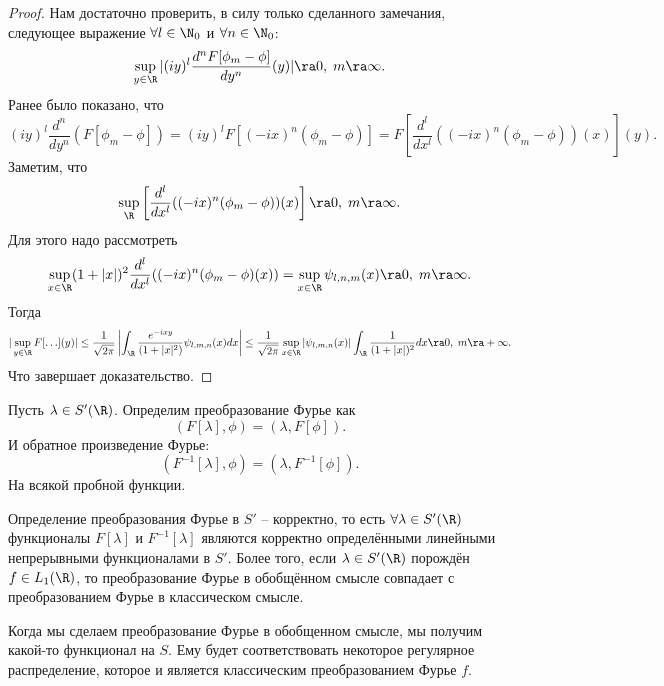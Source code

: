 \begin{proof}
    Нам достаточно проверить, в силу только сделанного замечания, следующее выражение $\forall l \in \N_0$ и $\forall n \in \N_0$:
    \[
        \sup\limits_{y \in \R}|(iy)^l \dfrac{d^n F[\phi_m - \phi]}{dy^n}(y)| \ra 0, \; m \ra \infty.
    \]
    Ранее было показано, что
    \[
        (iy)^l \dfrac{d^n}{dy^n}(F[\phi_m - \phi]) = (iy)^l F[(-ix)^n(\phi_m - \phi)] = F\left[\dfrac{d^l}{dx^l}((-ix)^n(\phi_m - \phi))(x)\right](y).
    \]
    Заметим, что
    \[
        \sup\limits_{\R}\left[\dfrac{d^l}{dx^l}((-ix)^n(\phi_m - \phi))(x)\right] \ra 0, \; m \ra \infty.
    \]
    Для этого надо рассмотреть
    \[
        \sup\limits_{x \in \R} (1 + |x|)^2 \dfrac{d^l}{dx^l}((-ix)^n(\phi_m - \phi)(x)) = \sup\limits_{x \in \R} \psi_{l, n, m}(x) \ra 0, \; m \ra \infty.
    \]
    Тогда
    \[
        |\sup\limits_{y \in \R}F[\ldots](y)| \leq \dfrac{1}{\sqrt {2\pi}}\left|\int_\R \dfrac{e^{-ixy}}{(1 + |x|^2)}\psi_{l, m, n}(x)dx\right| \leq \dfrac{1}{\sqrt {2\pi}}\sup\limits_{x \in \R}|\psi_{l, m, n}(x)|\int_{\R} \dfrac{1}{(1 + |x|)^2}dx \ra 0, \; m \ra +\infty.
    \]
    Что завершает доказательство.
\end{proof}
\begin{definition}
    Пусть $\lambda \in S'(\R)$.
    Определим преобразование Фурье как
    \[
        (F[\lambda], \phi) = (\lambda, F[\phi]).
    \]
    И обратное произведение Фурье:
    \[
        (F^{-1}[\lambda], \phi) = (\lambda, F^{-1}[\phi]).
    \]
    На всякой пробной функции.
\end{definition}
\begin{theorem}
    Определение преобразования Фурье в $S'$ -- корректно, то есть $\forall \lambda \in S'(\R)$ функционалы $F[\lambda]$ и $F^{-1}[\lambda]$ являются корректно определёнными линейными непрерывными функционалами в $S'$.
    Более того, если $\lambda \in S'(\R)$ порождён $f \in L_1(\R)$, то преобразование Фурье в обобщённом смысле совпадает с преобразованием Фурье в классическом смысле.
\end{theorem}
\begin{note}
Когда мы сделаем преобразование Фурье в обобщенном смысле, мы получим какой-то функционал на $S$. Ему будет соответствовать некоторое регулярное распределение, которое и является классическим преобразованием Фурье $f$. 
\end{note}

